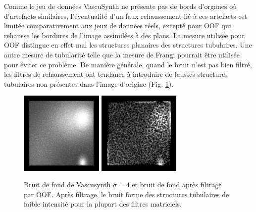 Comme le jeu de données VascuSynth ne présente pas de bords d'organes où d'artefacts similaires, l'éventualité d'un faux rehaussement lié à ces artefacts est limitée comparativement aux jeux de données réels, excepté pour OOF qui rehausse les bordures de l'image assimilées à des plans. La mesure utilisée pour OOF distingue en effet mal les structures planaires des structures tubulaires. Une autre mesure de tubularité telle que la mesure de Frangi pourrait être utilisée pour éviter ce problème. De manière générale, quand le bruit n'est pas bien filtré, les filtres de rehaussement ont tendance à introduire de fausses structures tubulaires non présentes dans l'image d'origine (Fig. \ref{fig:noisy_tubes}).
\begin{figure}[!ht]
  \centering
  \includegraphics[height=4cm]{Images/vascu_noise.png}
  \includegraphics[height=4cm]{Images/vascu_noise_OOF.png}
  \caption{Bruit de fond de Vascusynth $\sigma=4$ et bruit de fond après filtrage par OOF. Après filtrage, le bruit forme des structures tubulaires de faible intensité pour la plupart des filtres matriciels.}
  \label{fig:noisy_tubes}
\end{figure}


